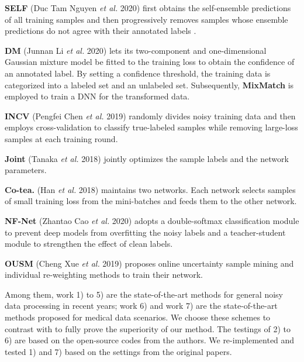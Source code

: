 \begin{enumerate}

{\item \textbf{SELF}\cite{2020SELF} (Duc Tam Nguyen \textit{et al.} 2020) first obtains the self-ensemble predictions of all training samples and then progressively removes samples whose ensemble predictions do not agree with their annotated labels \cite{2020Learning}.}

\item \textbf{DM}{\cite{2020DivideMix}} (Junnan Li \textit{et al.} 2020) lets its two-component and one-dimensional Gaussian mixture model be fitted to the training loss to obtain the confidence of an annotated label. By setting a confidence threshold, the training data is categorized into a labeled set and an unlabeled set. Subsequently, \textbf{MixMatch} \cite{david2019mixmatch} is employed to train a DNN for the transformed data.
\item \textbf{INCV}{\cite{chen2019understanding}} (Pengfei Chen \textit{et al.} 2019) randomly divides noisy training data and then employs cross-validation to classify true-labeled samples while removing large-loss samples at each training round. 
\item \textbf{Joint}{\cite{tanaka2018joint}} (Tanaka \textit{et al.} 2018)  jointly optimizes the sample labels and the network parameters.
\item \textbf{Co-tea.}{\cite{han2018co}} (Han \textit{et al.} 2018) maintains two networks. Each network selects samples of small training loss from the mini-batches and feeds them to the other network. 

\item \textbf{NF-Net}{\cite{cao2020breast}} (Zhantao Cao \textit{et al.} 2020) adopts a double-softmax classification module to prevent deep models from overfitting the noisy labels and a teacher-student module to strengthen the effect of clean labels. 
\item \textbf{OUSM}{\cite{cheng2019robust}} (Cheng Xue \textit{et al.} 2019) proposes online uncertainty sample mining and individual re-weighting methods to train their network.

\end{enumerate}



{Among them, work 1) to 5) are the state-of-the-art methods for general noisy data processing in recent years; work 6) and work 7) are the state-of-the-art methods proposed for medical data scenarios. We choose these schemes to contrast with to fully prove the superiority of our method. The testings of 2) to 6) are based on the open-source codes from the authors. We re-implemented and tested 1) and 7) based on the settings from the original papers.}











